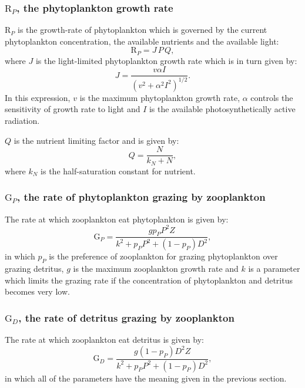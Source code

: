 \subsubsection{$\mathrm{R}_P$, the phytoplankton growth rate}\label{sec:R_P}

$\mathrm{R}_P$ is the growth-rate of phytoplankton which is governed by the
current phytoplankton concentration, the available nutrients and the
available light:
\begin{equation}
  \mathrm{R}_P=J\,P\,Q,
\end{equation}
where $J$ is the light-limited phytoplankton growth rate which is in turn given
by:
\begin{equation}
  J=\frac{v\alpha I}{(v^2+\alpha^2 I^2)^{1/2}}.
\end{equation}
In this expression, $v$ is the maximum phytoplankton growth rate, $\alpha$
controls the sensitivity of growth rate to light and $I$ is the available
photosynthetically active radiation.

$Q$ is the nutrient limiting factor and is given by:
\begin{equation}
  Q=\frac{N}{k_N+N},
\end{equation}
where $k_N$ is the half-saturation constant for nutrient.

\subsubsection{$\mathrm{G}_P$, the rate of phytoplankton grazing by zooplankton}\label{sec:G_P}
The rate at which zooplankton eat phytoplankton is given by:
\begin{equation}
  \mathrm{G}_P=\frac{g p_P P^2 Z}{k^2 + p_P P^2 + (1-p_P) D^2},
\end{equation}
in which $p_P$ is the preference of zooplankton for grazing phytoplankton
over grazing detritus, $g$ is the maximum zooplankton growth rate and $k$ is
a parameter which limits the grazing rate if the concentration of
phytoplankton and detritus becomes very low.

\subsubsection{$\mathrm{G}_D$, the rate of detritus grazing by zooplankton}\label{sec:G_D}
The rate at which zooplankton eat detritus is given by:
\begin{equation}
  \mathrm{G}_D=\frac{g (1-p_P) D^2 Z}{k^2 + p_P P^2 + (1-p_P) D^2},
\end{equation}
in which all of the parameters have the meaning given in the previous
section.

